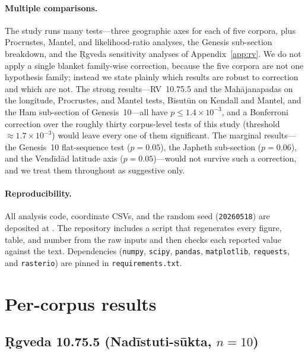 \documentclass[11pt]{article}
\begin{document}
\paragraph{Multiple comparisons.}
The study runs many tests---three geographic axes for each of five
corpora, plus Procrustes, Mantel, and likelihood-ratio analyses, the
Genesis sub-section breakdown, and the Ṛgveda sensitivity analyses
of Appendix~\ref{app:rv}. We do not apply a single blanket
family-wise correction, because the five corpora are not one
hypothesis family; instead we state plainly which results are robust
to correction and which are not. The strong results---RV~10.75.5 and
the Mahājanapadas on the longitude, Procrustes, and Mantel tests,
Bīsutūn on Kendall and Mantel, and the Ham sub-section of
Genesis~10---all have $p \leq 1.4\times10^{-3}$, and a Bonferroni
correction over the roughly thirty corpus-level tests of this study
(threshold $\approx 1.7\times10^{-3}$) would leave every one of them
significant. The marginal results---the Genesis~10 flat-sequence
test ($p=0.05$), the Japheth sub-section ($p=0.06$), and the
Vendīdād latitude axis ($p=0.05$)---would not survive such a
correction, and we treat them throughout as suggestive only.

\paragraph{Reproducibility.}
All analysis code, coordinate CSVs, and the random seed
(\texttt{20260518}) are deposited at \citep{repo2026}. The repository
includes a script that regenerates every figure, table, and number
from the raw inputs and then checks each reported value against the
text. Dependencies (\texttt{numpy}, \texttt{scipy}, \texttt{pandas},
\texttt{matplotlib}, \texttt{requests}, and \texttt{rasterio}) are
pinned in \texttt{requirements.txt}.

\section{Per-corpus results}\label{sec:results}

\subsection{Ṛgveda 10.75.5 (Nadīstuti-sūkta, $n=10$)}\label{sec:rv}
\end{document}
